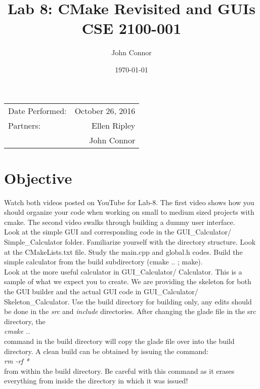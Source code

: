 \documentclass{article}
\title{Lab 8: CMake Revisited and GUIs \\ CSE 2100-001} %
\author{John Connor} %
\date{\today} %
\begin{document}
\maketitle %

\begin{center}
\begin{tabular}{l r}
Date Performed: & October 26, 2016 \\ %
Partners: & Ellen Ripley \\ %
& John Connor \\
\end{tabular}
\end{center}



\section{Objective}

Watch both videos posted on YouTube for Lab-8. The first video shows how you should organize your code when working on small to medium sized projects with cmake. The second video swalks through building a dummy user interface.\\

Look at the simple GUI and corresponding code in the GUI\_Calculator/ Simple\_Calculator folder.
Familiarize yourself with the directory structure. Look at the CMakeLists.txt file. Study the main.cpp and global.h codes. Build the simple calculator from the build subdirectory (cmake .. ; make).\\

Look at the more useful calculator in GUI\_Calculator/ Calculator. This is a sample of what we expect you to create. We are providing the skeleton for both the GUI builder and the actual GUI code in GUI\_Calculator/ Skeleton\_Calculator. Use the build directory for building only, any edits should be done in the \textit{src} and \textit{include} directories. After changing the glade file in the src directory, the\\ \textit{cmake ..} \\command in the build directory will copy the glade file over into the build directory. A clean build can be obtained by issuing the command:\\ \textit{rm -rf *} \\from within the build directory. Be careful with this command as it erases everything from inside the directory in which it was issued! \\
\end{document}
